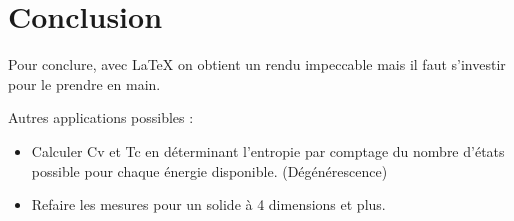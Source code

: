 \section*{Conclusion}

Pour conclure, avec \LaTeX{} on obtient un rendu impeccable mais il faut s'investir pour le prendre en main.


Autres applications possibles :
\begin{itemize}
\item Calculer Cv et Tc en déterminant l'entropie par comptage du nombre d'états possible pour chaque énergie disponible. (Dégénérescence)
\item Refaire les mesures pour un solide à 4 dimensions et plus.
\end{itemize}
